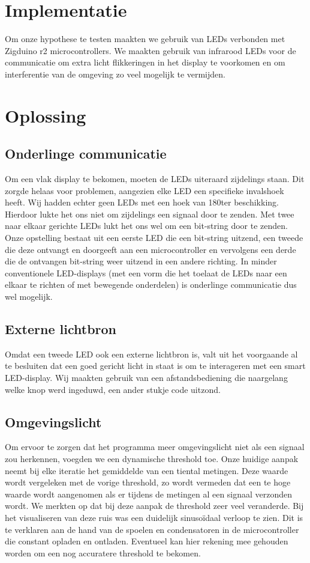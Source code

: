 \documentclass{article}
\begin{document}
\section{Implementatie}
Om onze hypothese te testen maakten we gebruik van LEDs verbonden met Zigduino r2 microcontrollers. We maakten gebruik van infrarood LEDs voor de communicatie om extra licht flikkeringen in het display te voorkomen en om interferentie van de omgeving zo veel mogelijk te vermijden.


\section{Oplossing}

\subsection{Onderlinge communicatie}
Om een vlak display te bekomen, moeten de LEDs uiteraard zijdelings staan. Dit zorgde helaas voor problemen, aangezien elke LED een specifieke invalshoek heeft. Wij hadden echter geen LEDs met een hoek van 180\degree ter beschikking. Hierdoor lukte het ons niet om zijdelings een signaal door te zenden. 
Met twee naar elkaar gerichte LEDs lukt het ons wel om een bit-string door te zenden. Onze opstelling bestaat uit een eerste LED die een bit-string uitzend, een tweede die deze ontvangt en doorgeeft aan een microcontroller en vervolgens een derde die de ontvangen bit-string weer uitzend in een andere richting. 
In minder conventionele LED-displays (met een vorm die het toelaat de LEDs naar een elkaar te richten of met bewegende onderdelen) is onderlinge communicatie dus wel mogelijk.

\subsection{Externe lichtbron}
Omdat een tweede LED ook een externe lichtbron is, valt uit het voorgaande al te besluiten dat een goed gericht licht in staat is om te interageren met een smart LED-display. Wij maakten gebruik van een afstandsbediening die naargelang welke knop werd ingeduwd, een ander stukje code uitzond.

\subsection{Omgevingslicht}
Om ervoor te zorgen dat het programma meer omgevingslicht niet als een signaal zou herkennen, voegden we een dynamische threshold toe.
Onze huidige aanpak neemt bij elke iteratie het gemiddelde van een tiental metingen. Deze waarde wordt vergeleken met de vorige threshold, zo wordt vermeden dat een te hoge waarde wordt aangenomen als er tijdens de metingen al een signaal verzonden wordt.
We merkten op dat bij deze aanpak de threshold zeer veel veranderde. Bij het visualiseren van deze ruis was een duidelijk sinusoïdaal verloop te zien. Dit is te verklaren aan de hand van de spoelen en condensatoren in de microcontroller die constant opladen en ontladen. Eventueel kan hier rekening mee gehouden worden om een nog accuratere threshold te bekomen.
\end{document}
